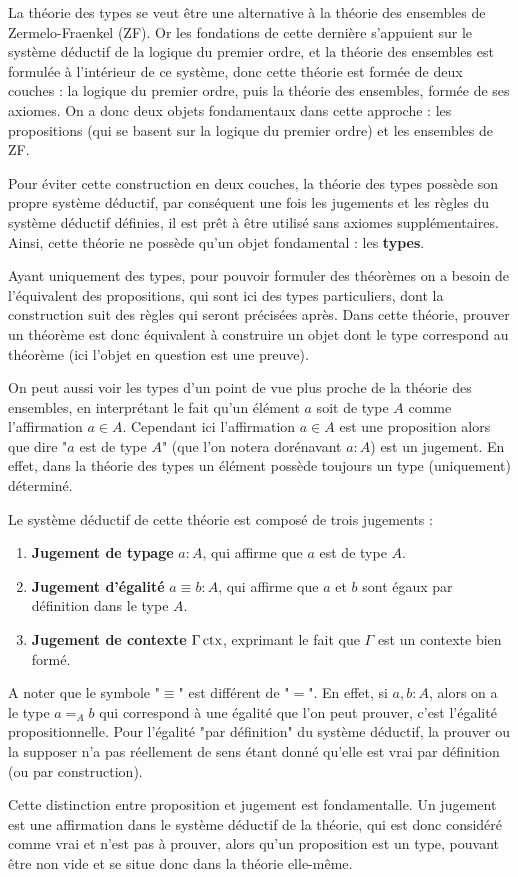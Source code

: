 \documentclass[../../rapport.tex]{subfiles}
\begin{document}
  La théorie des types se veut être une alternative à la théorie des ensembles de Zermelo-Fraenkel (ZF).
  Or les fondations de cette dernière s'appuient sur le système déductif de la logique du premier ordre,
  et la théorie des ensembles est formulée à l'intérieur de ce système, donc cette théorie est formée
  de deux couches : la logique du premier ordre, puis la théorie des ensembles, formée de ses axiomes.
  On a donc deux objets fondamentaux dans cette approche :
  les propositions (qui se basent sur la logique du premier ordre) et les ensembles de ZF.

  Pour éviter cette construction en deux couches, la théorie des types possède son propre système déductif,
  par conséquent une fois les jugements et les règles du système déductif définies,
  il est prêt à être utilisé sans axiomes supplémentaires.
  Ainsi, cette théorie ne possède qu'un objet fondamental : les \textbf{types}.

  Ayant uniquement des types, pour pouvoir formuler des théorèmes on a besoin de l'équivalent des propositions,
  qui sont ici des types particuliers, dont la construction suit des règles qui seront précisées après.
  Dans cette théorie, prouver un théorème est donc équivalent à construire un objet
  dont le type correspond au théorème (ici l'objet en question est une preuve).

  On peut aussi voir les types d'un point de vue plus proche de la théorie des ensembles,
  en interprétant le fait qu'un élément $a$ soit de type $A$ comme l'affirmation $a \in A$.
  Cependant ici l'affirmation $a \in A$ est une proposition alors que dire "$a$ est de type $A$"
  (que l'on notera dorénavant $a : A$) est un jugement. En effet,
  dans la théorie des types un élément possède toujours un type (uniquement) déterminé.

  Le système déductif de cette théorie est composé de trois jugements :
  \begin{enumerate}
    \item \textbf{Jugement de typage} $a : A$, qui affirme que $a$ est de type $A$.
    \item \textbf{Jugement d'égalité} $a \equiv b : A$, qui affirme que $a$ et $b$ sont égaux par définition dans le type $A$.
    \item \textbf{Jugement de contexte} $\Gamma \operatorname{ctx}$, exprimant le fait que $\Gamma$ est un contexte bien formé.
  \end{enumerate}
  A noter que le symbole "$\equiv$" est différent de "$=$".
  En effet, si $a, b : A$, alors on a le type $a =_A b$ qui correspond à une égalité
  que l'on peut prouver, c'est l'égalité propositionnelle.
  Pour l'égalité "par définition" du système déductif, la prouver ou la supposer n'a pas réellement de sens
  étant donné qu'elle est vrai par définition (ou par construction).

  Cette distinction entre proposition et jugement est fondamentalle.
  Un jugement est une affirmation dans le système déductif de la théorie, qui est donc considéré comme vrai et n'est pas à prouver,
  alors qu'un proposition est un type, pouvant être non vide et se situe donc dans la théorie elle-même.
\end{document}
